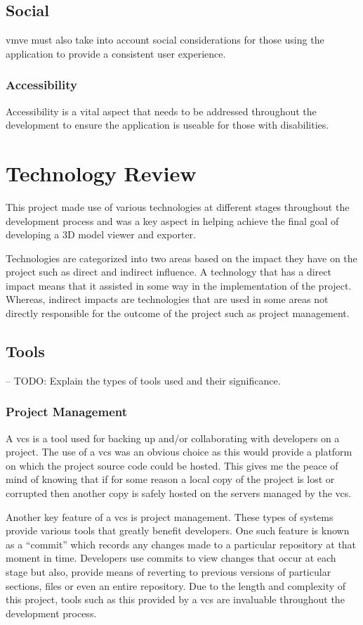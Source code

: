 \documentclass[11pt]{article}
\begin{document}
\subsection{Social}
\gls{vmve} must also take into account social considerations for those using the
application to provide a consistent user experience.

\subsubsection{Accessibility}
Accessibility is a vital aspect that needs to be addressed throughout the
development to ensure the application is useable for those with disabilities.

\section{Technology Review} \label{technology_review}
This project made use of various technologies at different stages throughout the
development process and was a key aspect in helping achieve the final goal of
developing a 3D model viewer and exporter.

Technologies are categorized into two areas based on the impact they have on the
project such as direct and indirect influence. A technology that has a direct
impact means that it assisted in some way in the implementation of the project.
Whereas, indirect impacts are technologies that are used in some areas not
directly responsible for the outcome of the project such as project management.

\subsection{Tools}
-- TODO: Explain the types of tools used and their significance.

\subsubsection{Project Management}
A \gls{vcs} is a tool used for backing up and/or collaborating with developers
on a project. The use of a \gls{vcs} was an obvious choice as this would provide
a platform on which the project source code could be hosted. This gives me the
peace of mind of knowing that if for some reason a local copy of the project is
lost or corrupted then another copy is safely hosted on the servers managed by
the \gls{vcs}.

Another key feature of a \gls{vcs} is project management. These types of systems
provide various tools that greatly benefit developers. One such feature is known
as a ``commit'' which records any changes made to a particular repository at
that moment in time. Developers use commits to view changes that occur at each
stage but also, provide means of reverting to previous versions of particular
sections, files or even an entire repository. Due to the length and complexity
of this project, tools such as this provided by a \gls{vcs} are invaluable
throughout the development process.
\end{document}

